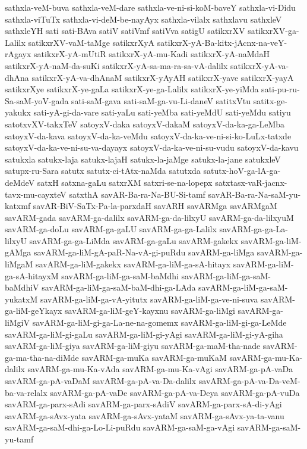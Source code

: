 {sathxla-veM-buva
sathxla-veM-dare
sathxla-ve-ni-si-koM-baveY
sathxla-vi-Didu
sathxla-viTuTx
sathxla-vi-deM-be-nayAyx
sathxla-vilalx
sathxlavu
sathxleV
sathxleYH
sati
sati-BAva
satiV
satiVmf
satiVva
satigU
satikxrXV
satikxrXV-ga-Lalilx
satikxrXV-vaM-taMge
satikxrXyA
satikxrX-yA-Ba-kitx-jAcnx-na-veY-rAgayx
satikxrX-yA-mUtiR
satikxrX-yA-mu-Kadi
satikxrX-yA-naMdaH
satikxrX-yA-naM-da-suKi
satikxrX-yA-sa-ma-ra-sa-vA-dalilx
satikxrX-yA-va-dhAna
satikxrX-yA-va-dhAnaM
satikxrX-yAyAH
satikxrX-yave
satikxrX-yayA
satikxrXye
satikxrX-ye-gaLa
satikxrX-ye-ga-Lalilx
satikxrX-ye-yiMda
sati-pu-ru-Sa-saM-yoV-gada
sati-saM-gava
sati-saM-ga-vu-Li-daneV
satitxVtu
satitx-ge-yakukx
sati-yA-gi-da-vare
sati-yaLu
sati-yeMba
sati-yeMdU
sati-yeMdu
satiyu
satotxvXV-takxTeV
satoyxV-daka
satoyxV-dakaM
satoyxV-da-ka-ga-LeMba
satoyxV-da-kava
satoyxV-da-ka-veMdu
satoyxV-da-ka-ve-ni-si-ko-LuLx-tatxde
satoyxV-da-ka-ve-ni-su-va-dayayx
satoyxV-da-ka-ve-ni-su-vudu
satoyxV-da-kavu
satukxla
satukx-laja
satukx-lajaH
satukx-la-jaMge
satukx-la-jane
satukxleV
satupx-ru-Sara
satutx
satutx-ci-tAtx-naMda
satutxda
satutx-hoV-ga-lA-ga-deMdeV
satxH
satxna-gaLu
satxrXM
satxri-se-na-lopepx
satxtasx-vaR-jacnx-tavx-mu-cayxteV
satxthA
savAR-Ba-ra-Na-BU-Si-tamf
savAR-Ba-ra-Na-saM-yu-katxmf
savAR-BiV-SaTx-Pa-la-parxdaH
savARH
savARMga
savARMgaM
savARM-gada
savARM-ga-dalilx
savARM-ga-da-lilxyU
savARM-ga-da-lilxyuM
savARM-ga-doLu
savARM-ga-gaLU
savARM-ga-ga-Lalilx
savARM-ga-ga-La-lilxyU
savARM-ga-ga-LiMda
savARM-ga-gaLu
savARM-gakekx
savARM-ga-liM-gAMga
savARM-ga-liM-gA-paR-Na-vA-gi-puRdu
savARM-ga-liMga
savARM-ga-liMgaM
savARM-ga-liM-gakekx
savARM-ga-liM-ga-sA-hitayx
savARM-ga-liM-ga-sA-hitayxM
savARM-ga-liM-ga-saM-baMdhi
savARM-ga-liM-ga-saM-baMdhiV
savARM-ga-liM-ga-saM-baM-dhi-ga-LAda
savARM-ga-liM-ga-saM-yukatxM
savARM-ga-liM-ga-vA-yitutx
savARM-ga-liM-ga-ve-ni-suva
savARM-ga-liM-geYkayx
savARM-ga-liM-geY-kayxnu
savARM-ga-liMgi
savARM-ga-liMgiV
savARM-ga-liM-gi-ga-La-ne-na-gomemx
savARM-ga-liM-gi-ga-LeMde
savARM-ga-liM-gi-gaLu
savARM-ga-liM-gi-yAgi
savARM-ga-liM-gi-yA-giha
savARM-ga-liM-giya
savARM-ga-liM-giyu
savARM-ga-maM-tha-nade
savARM-ga-ma-tha-na-diMde
savARM-ga-muKa
savARM-ga-muKaM
savARM-ga-mu-Ka-dalilx
savARM-ga-mu-Ka-vAda
savARM-ga-mu-Ka-vAgi
savARM-ga-pA-vaDa
savARM-ga-pA-vaDaM
savARM-ga-pA-va-Da-dalilx
savARM-ga-pA-va-Da-veM-ba-va-relalx
savARM-ga-pA-vaDe
savARM-ga-pA-va-Deya
savARM-ga-pA-vuDa
savARM-ga-parx-sAdi
savARM-ga-parx-sAdiV
savARM-ga-parx-sA-di-yAgi
savARM-ga-sAvx-yata
savARM-ga-sAvx-yataM
savARM-ga-sAvx-ya-ta-vanu
savARM-ga-saM-dhi-ga-Lo-Li-puRdu
savARM-ga-saM-ga-vAgi
savARM-ga-saM-yu-tamf
}

